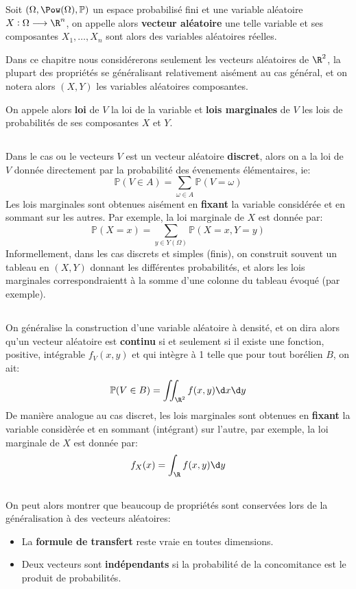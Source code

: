 Soit \((\Omega, \Pow(\Omega), \mathbb{P})\) un espace probabilisé fini et une variable aléatoire \(X : \Omega \longrightarrow \R^n\), on appelle alors \textbf{vecteur aléatoire} une telle variable et ses composantes \(X_1, \ldots, X_n\) sont alors des variables aléatoires réelles.\< 

Dans ce chapitre nous considérerons seulement les vecteurs aléatoires de \(\R^2\), la plupart des propriétés se généralisant relativement aisément au cas général, et on notera alors \((X, Y)\) les variables aléatoires composantes.\<

On appele alors \textbf{loi} de \(V\) la loi de la variable et \textbf{lois marginales} de \(V\) les lois de probabilités de ses composantes \(X\) et \(Y\).

\subsection*{}
Dans le cas ou le vecteurs \(V\) est un vecteur aléatoire \textbf{discret}, alors on a la loi de \(V\) donnée directement par la probabilité des évenements élémentaires, ie:
\[
   \mathbb{P}(V \in A) = \sum_{\omega \in A} \mathbb{P}(V = \omega)
\]
Les lois marginales sont obtenues aisément en \textbf{fixant} la variable considérée et en sommant sur les autres. Par exemple, la loi marginale de \(X\) est donnée par:
\[
   \mathbb{P}(X = x) = \sum_{y \in Y(\Omega)} \mathbb{P}(X = x, Y = y)
\]
Informellement, dans les cas discrets et simples (finis), on construit souvent un tableau en \((X, Y)\) donnant les différentes probabilités, et alors les lois marginales correspondraientt à la somme d'une colonne du tableau évoqué (par exemple).

\subsection*{}
On généralise la construction d'une variable aléatoire à densité, et on dira alors qu'un vecteur aléatoire est \textbf{continu} si et seulement si il existe une fonction, positive, intégrable \(f_V(x, y)\) et qui intègre à 1 telle que pour tout borélien \(B\), on ait:
\[
   \mathbb{P}(V \in B) = \iint_{\R^2} f(x,y)  \d x \d y
\]
De manière analogue au cas discret, les lois marginales sont obtenues en \textbf{fixant} la variable considèrée et en sommant (intégrant) sur l'autre, par exemple, la loi marginale de \(X\) est donnée par:
\[
   f_X(x) = \int_{\R} f(x,y) \d y
\]

\subsection*{}
On peut alors montrer que beaucoup de propriétés sont conservées lors de la généralisation à des vecteurs aléatoires:
\begin{itemize}
   \item La \textbf{formule de transfert} reste vraie en toutes dimensions.
   \item Deux vecteurs sont \textbf{indépendants} si la probabilité de la concomitance est le produit de probabilités.
\end{itemize}

